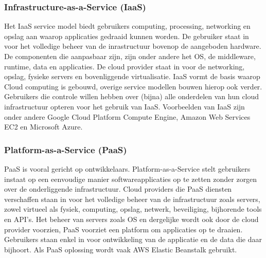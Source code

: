 \subsubsection{Infrastructure-as-a-Service (IaaS)}
Het IaaS service model biedt gebruikers computing, processing, networking en opslag aan waarop applicaties gedraaid kunnen worden. De gebruiker staat in voor het volledige beheer van de inrastructuur bovenop de aangeboden hardware. De componenten die aanpasbaar zijn, zijn onder andere het OS, de middleware, runtime, data en applicaties. De cloud provider staat in voor de networking, opslag, fysieke servers en bovenliggende virtualisatie. IaaS vormt de basis waarop Cloud computing is gebouwd, overige service modellen bouwen hierop ook verder. Gebruikers die controle willen hebben over (bijna) alle onderdelen van hun cloud infrastructuur opteren voor het gebruik van IaaS. Voorbeelden van IaaS zijn onder andere Google Cloud Platform Compute Engine, Amazon Web Services EC2 en Microsoft Azure.

\subsubsection{Platform-as-a-Service (PaaS)}
PaaS is vooral gericht op ontwikkelaars. Platform-as-a-Service stelt gebruikers instaat op een eenvoudige manier softwareapplicaties op te zetten zonder zorgen over de onderliggende infrastructuur. Cloud providers die PaaS diensten verschaffen staan in voor het volledige beheer van de infrastructuur zoals servers, zowel virtueel als fysiek, computing, opslag, netwerk, beveiliging, bijhorende tools en API's. Het beheer van servers zoals OS en dergelijke wordt ook door de cloud provider voorzien, PaaS voorziet een platform om applicaties op te draaien. Gebruikers staan enkel in voor ontwikkeling van de applicatie en de data die daar bijhoort. Als PaaS oplossing wordt vaak AWS Elastic Beanstalk gebruikt.

